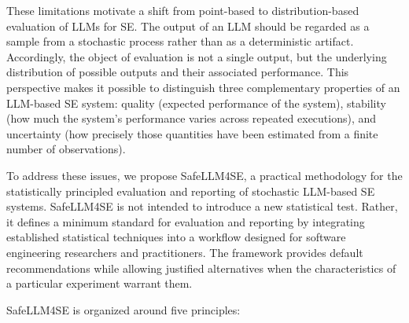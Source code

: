 \documentclass{IEEEcsmag}
\begin{document}
These limitations motivate a shift from point-based to distribution-based evaluation of LLMs for SE. The output of an LLM should be regarded as a sample from a stochastic process rather than as a deterministic artifact. Accordingly, the object of evaluation is not a single output, but the underlying distribution of possible outputs and their associated performance. This perspective makes it possible to distinguish three complementary properties of an LLM-based SE system: quality (expected performance of the system), stability (how much the system's performance varies across repeated executions), and uncertainty (how precisely those quantities have been estimated from a finite number of observations).

To address these issues, we propose SafeLLM4SE, a practical methodology for the statistically principled evaluation and reporting of stochastic LLM-based SE systems. SafeLLM4SE is not intended to introduce a new statistical test. Rather, it defines a minimum standard for evaluation and reporting by integrating established statistical techniques into a workflow designed for software engineering researchers and practitioners. The framework provides default recommendations while allowing justified alternatives when the characteristics of a particular experiment warrant them.

SafeLLM4SE is organized around five principles:
\end{document}
